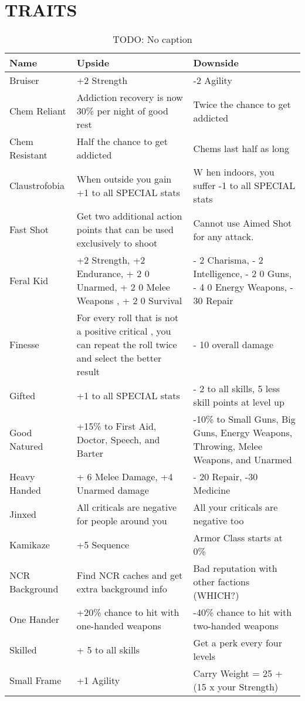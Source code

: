 \documentclass{report}
\begin{document}
\chapter{TRAITS}
\begin{table}[H]
  \centering
  \begin{tabular}{p{30mm}p{30mm}p{30mm}}
\bfseries Name & \bfseries Upside & \bfseries Downside \\
\hline
Bruiser  & +2 Strength  & -2  Agility \\
Chem Reliant  & Addiction recovery is now 30\% per night of good rest   & Twice the chance to get addicted  \\
Chem Resistant  & Half the chance to get addicted  & Chems last half as long  \\
Claustrofobia & When outside you gain +1 to all SPECIAL stats  & W hen indoors, you suffer -1 to all SPECIAL stats \\
Fast Shot  & Get two additional action points that can be used exclusively to shoot & Cannot use Aimed Shot for any attack.  \\
Feral Kid  & +2 Strength,  +2 Endurance,  + 2 0 Unarmed, + 2 0 Melee  Weapons ,  + 2 0 Survival & - 2  Charisma, - 2  Intelligence,  - 2 0 Guns, - 4 0 Energy Weapons, - 30 Repair \\
Finesse  & For every roll that is not a positive critical , you can repeat the roll twice and select the better result   & - 10  overall damage  \\
Gifted  & +1 to all SPECIAL stats  & - 2  to all skills, 5 less skill points at level up  \\
Good Natured  & +15\% to First Aid, Doctor, Speech, and Barter  & -10\% to Small Guns, Big Guns, Energy Weapons, Throwing, Melee Weapons, and Unarmed  \\
Heavy Handed  & + 6  Melee Damage,  +4 Unarmed damage & - 20 Repair, -30 Medicine \\
Jinxed  & All criticals are negative for people around you & All your criticals are negative too \\
Kamikaze  & +5 Sequence  & Armor Class starts at 0\%  \\
NCR Background  & Find NCR caches and get extra background info & Bad reputation with other factions (WHICH?) \\
One Hander  & +20\% chance to hit with one-handed weapons  & -40\% chance to hit with two-handed weapons  \\
Skilled  & + 5  to all skills  & Get a perk every four levels  \\
Small Frame  & +1 Agility  & Carry Weight = 25 + (15 x your Strength)  \\
  \end{tabular}
  \caption{TODO: No caption}
  \label{tab:1}
\end{table}
\end{document}
